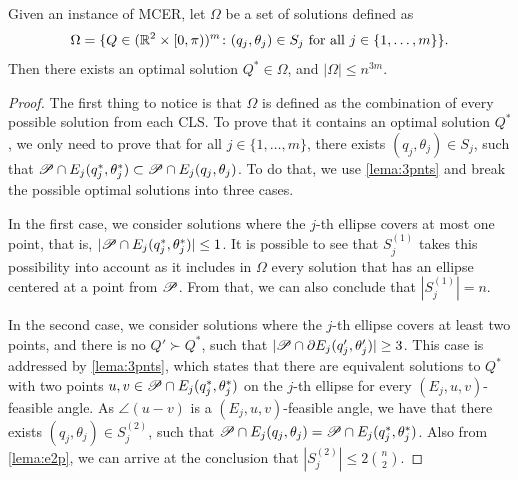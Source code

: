 \begin{thm}\label{th:mcer}
	Given an instance of MCER, let $\Omega$ be a set of solutions defined as 
	\begin{equation*}\label{eq:omega}
	\Omega = \{Q \in (\mathbb{R}^2\times[0, \pi))^m \colon (q_j, \theta_j) \in S_j \textnormal{ for all } j\in\{1, \dots, m\}\}.
	\end{equation*}
	Then there exists an optimal solution $Q^* \in \Omega$, and $|\Omega|\le n^{3m}$.
\end{thm}
\begin{proof}
	The first thing to notice is that $\Omega$ is defined as the combination of every possible solution from each CLS. To prove that it contains an optimal solution $Q^*$, we only need to prove that for all $j\in\{1, \dots, m\}$, there exists $(q_j, \theta_j)\in S_j$, such that $\mathscr{P} \cap E_j(q_j^*, \theta_j^*) \subset \mathscr{P} \cap E_j(q_j, \theta_j)$. To do that, we use \autoref{lema:3pnts} and break the possible optimal solutions into three cases.
	
	In the first case, we consider solutions where the $j$-th ellipse covers at most one point, that is, $|\mathscr{P} \cap E_j(q_j^*, \theta_j^*)|\le1$. It is possible to see that $S_j^{(1)}$ takes this possibility into account as it includes in $\Omega$ every solution that has an ellipse centered at a point from $\mathscr{P}$. From that, we can also conclude that $|S_j^{(1)}| = n$.
	
	In the second case, we consider solutions where the $j$-th ellipse covers at least two points, and there is no $Q' \succ Q^*$, such that $|\mathscr{P} \cap \partial E_j(q_j', \theta_j')| \ge 3$.
	This case is addressed by \autoref{lema:3pnts}, which states that there are equivalent solutions to $Q^*$ with two points $u, v \in \mathscr{P} \cap E_j(q_j^*, \theta_j^*)$ on the $j$-th ellipse for every $(E_j, u, v)$-feasible angle.
	As $\angle(u-v)$ is a $(E_j, u, v)$-feasible angle, we have that there exists $(q_j, \theta_j) \in S_j^{(2)}$, such that $\mathscr{P} \cap E_j(q_j, \theta_j) = \mathscr{P} \cap E_j(q_j^*, \theta_j^*)$.
	{\color{blue}Also from \autoref{lema:e2p}, we can arrive at the conclusion that $|S_j^{(2)}| \le 2\binom{n}{2}$.}
	
	

\end{proof}
